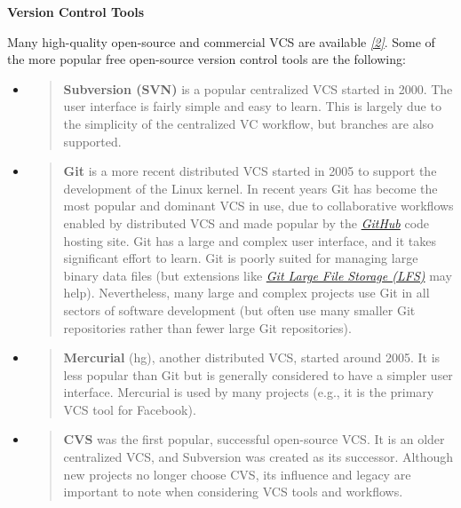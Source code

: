 \documentclass[]{article}
\begin{document}
\textbf{Version Control Tools}

Many high-quality open-source and commercial VCS are available
\protect\hyperlink{h.f53m6pxt4rgc}{\emph{{[}2{]}}}. Some of the more
popular free open-source version control tools are the following:

\begin{itemize}
\item
  \begin{quote}
  \textbf{Subversion (SVN)} is a popular centralized VCS started in
  2000. The user interface is fairly simple and easy to learn. This is
  largely due to the simplicity of the centralized VC workflow, but
  branches are also supported.
  \end{quote}
\item
  \begin{quote}
  \textbf{Git} is a more recent distributed VCS started in 2005 to
  support the development of the Linux kernel. In recent years Git has
  become the most popular and dominant VCS in use, due to collaborative
  workflows enabled by distributed VCS and made popular by the
  \href{http://www.github.com}{\emph{GitHub}} code hosting site. Git has
  a large and complex user interface, and it takes significant effort to
  learn. Git is poorly suited for managing large binary data files (but
  extensions like \href{https://git-lfs.github.com}{\emph{Git Large File
  Storage (LFS)}} may help). Nevertheless, many large and complex
  projects use Git in all sectors of software development (but often use
  many smaller Git repositories rather than fewer large Git
  repositories).
  \end{quote}
\item
  \begin{quote}
  \textbf{Mercurial} (hg), another distributed VCS, started around 2005.
  It is less popular than Git but is generally considered to have a
  simpler user interface. Mercurial is used by many projects (e.g., it
  is the primary VCS tool for Facebook).
  \end{quote}
\item
  \begin{quote}
  \textbf{CVS} was the first popular, successful open-source VCS. It is
  an older centralized VCS, and Subversion was created as its successor.
  Although new projects no longer choose CVS, its influence and legacy
  are important to note when considering VCS tools and workflows.
  \end{quote}
\end{itemize}
\end{document}
